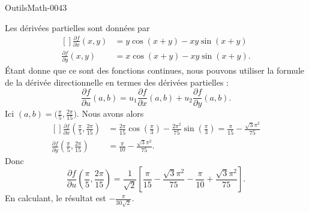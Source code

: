 
\begin{corrige}{OutilsMath-0043}

    Les dérivées partielles sont données par
    \begin{equation}
        \begin{aligned}[]
            \frac{ \partial f }{ \partial x }(x,y)&=y\cos(x+y)-xy\sin(x+y)\\
            \frac{ \partial f }{ \partial y }(x,y)&=x\cos(x+y)-xy\sin(x+y).
        \end{aligned}
    \end{equation}
    Étant donne que ce sont des fonctions continues, nous pouvons utiliser la formule de la dérivée directionnelle en termes des dérivées partielles :
    \begin{equation}
        \frac{ \partial f }{ \partial u }(a,b)=u_1\frac{ \partial f }{ \partial x }(a,b)+u_2\frac{ \partial f }{ \partial y }(a,b).
    \end{equation}
    Ici $(a,b)=\big( \frac{ \pi }{ 5 },\frac{ 2\pi }{ 15 } \big)$. Nous avons alors
    \begin{equation}
        \begin{aligned}[]
            \frac{ \partial f }{ \partial x }(\frac{ \pi }{ 5 },\frac{ 2\pi }{ 15 })&=\frac{ 2\pi }{ 15 }\cos(\frac{ \pi }{ 3 })-\frac{ 2\pi^2 }{ 75 }\sin(\frac{ \pi }{ 3 })=\frac{ \pi }{ 15 }-\frac{ \sqrt{3}\pi^2 }{ 75 }\\
            \frac{ \partial f }{ \partial y }(\frac{ \pi }{ 5 },\frac{ 2\pi }{ 15 })&=\frac{ \pi }{ 10 }-\frac{ \sqrt{3}\pi^2 }{ 75 }.
        \end{aligned}
    \end{equation}
    Donc
    \begin{equation}
        \frac{ \partial f }{ \partial u }(\frac{ \pi }{ 5 },\frac{ 2\pi }{ 15 })=\frac{1}{ \sqrt{2} }\left[ \frac{ \pi }{ 15 }-\frac{ \sqrt{3}\pi^2 }{ 75 }-\frac{ \pi }{ 10 }+\frac{ \sqrt{3}\pi^2 }{ 75 } \right].
    \end{equation}
    En calculant, le résultat est $-\frac{ \pi }{ 30\sqrt{2} }$.

\end{corrige}
